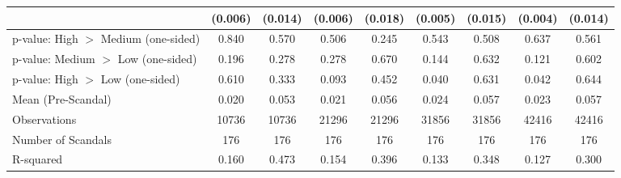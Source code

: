 {\begin{tabular}{l*{8}{c}}
            &     (0.006)         &     (0.014)         &     (0.006)         &     (0.018)         &     (0.005)         &     (0.015)         &     (0.004)         &     (0.014)         \\
\midrule
p-value: High $>$ Medium (one-sided)&       0.840         &       0.570         &       0.506         &       0.245         &       0.543         &       0.508         &       0.637         &       0.561         \\
p-value: Medium $>$ Low (one-sided)&       0.196         &       0.278         &       0.278         &       0.670         &       0.144         &       0.632         &       0.121         &       0.602         \\
p-value: High $>$ Low (one-sided)&       0.610         &       0.333         &       0.093         &       0.452         &       0.040         &       0.631         &       0.042         &       0.644         \\
Mean (Pre-Scandal)&       0.020         &       0.053         &       0.021         &       0.056         &       0.024         &       0.057         &       0.023         &       0.057         \\
Observations&       10736         &       10736         &       21296         &       21296         &       31856         &       31856         &       42416         &       42416         \\
Number of Scandals&         176         &         176         &         176         &         176         &         176         &         176         &         176         &         176         \\
R-squared   &       0.160         &       0.473         &       0.154         &       0.396         &       0.133         &       0.348         &       0.127         &       0.300         \\
\bottomrule
\end{tabular}
}
